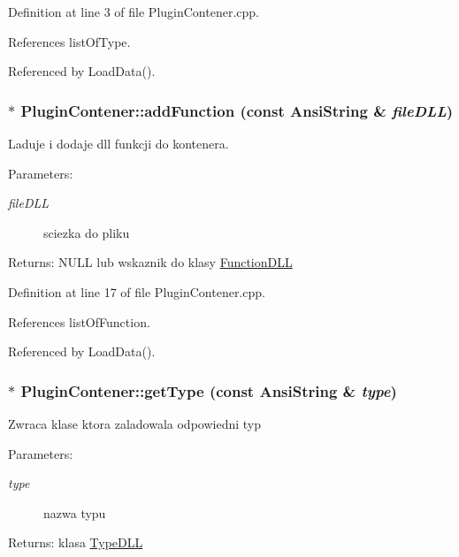 Definition at line 3 of file PluginContener.cpp.

References listOfType.

Referenced by LoadData().\hypertarget{classPluginContener_4ecede9ea722920d63fed61089084b52}{
\subsubsection[addFunction]{ $\ast$ PluginContener::addFunction (const AnsiString \& {\em fileDLL})}}
\label{classPluginContener_4ecede9ea722920d63fed61089084b52}


Laduje i dodaje dll funkcji do kontenera. \begin{Desc}
\item[Parameters:]
\begin{description}
\item[{\em fileDLL}]sciezka do pliku \end{description}
\end{Desc}
\begin{Desc}
\item[Returns:]NULL lub wskaznik do klasy \hyperlink{classFunctionDLL}{FunctionDLL} \end{Desc}


Definition at line 17 of file PluginContener.cpp.

References listOfFunction.

Referenced by LoadData().\hypertarget{classPluginContener_647864e7e0602077aad6a56155f4978a}{
\subsubsection[getType]{ $\ast$ PluginContener::getType (const AnsiString \& {\em type})}}
\label{classPluginContener_647864e7e0602077aad6a56155f4978a}


Zwraca klase ktora zaladowala odpowiedni typ \begin{Desc}
\item[Parameters:]
\begin{description}
\item[{\em type}]nazwa typu \end{description}
\end{Desc}
\begin{Desc}
\item[Returns:]klasa \hyperlink{classTypeDLL}{TypeDLL} \end{Desc}


